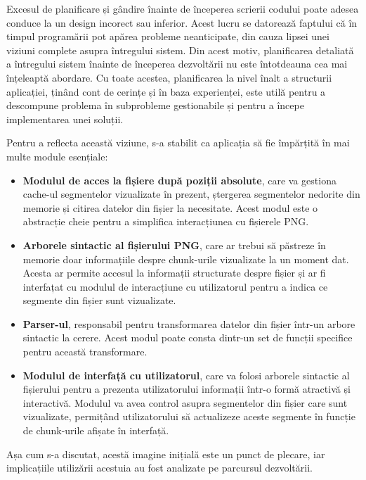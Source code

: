 \documentclass[a4paper,12pt]{report}
\begin{document}
Excesul de planificare și gândire înainte de începerea scrierii codului
poate adesea conduce la un design incorect sau inferior.
Acest lucru se datorează faptului că în timpul programării pot apărea probleme neanticipate,
din cauza lipsei unei viziuni complete asupra întregului sistem.
Din acest motiv, planificarea detaliată a întregului sistem înainte de începerea dezvoltării
nu este întotdeauna cea mai înțeleaptă abordare.
Cu toate acestea, planificarea la nivel înalt a structurii aplicației,
ținând cont de cerințe și în baza experienței,
este utilă pentru a descompune problema în subprobleme gestionabile
și pentru a începe implementarea unei soluții.

Pentru a reflecta această viziune, s-a stabilit ca aplicația
să fie împărțită în mai multe module esențiale:
\begin{itemize}
  \item 
  \textbf{Modulul de acces la fișiere după poziții absolute},
  care va gestiona cache-ul segmentelor vizualizate în prezent,
  ștergerea segmentelor nedorite din memorie și citirea datelor din fișier la necesitate.
  Acest modul este o abstracție cheie pentru a simplifica interacțiunea cu fișierele \ac{PNG}.

  \item
  \textbf{Arborele sintactic al fișierului \ac{PNG}},
  care ar trebui să păstreze în memorie doar informațiile despre
  chunk-urile vizualizate la un moment dat.
  Acesta ar permite accesul la informații structurate despre fișier
  și ar fi interfațat cu modulul de interacțiune cu utilizatorul
  pentru a indica ce segmente din fișier sunt vizualizate.

  \item
  \textbf{Parser-ul}, responsabil pentru transformarea datelor
  din fișier într-un arbore sintactic la cerere.
  Acest modul poate consta dintr-un set de funcții specifice pentru această transformare.

  \item
  \textbf{Modulul de interfață cu utilizatorul},
  care va folosi arborele sintactic al fișierului pentru
  a prezenta utilizatorului informații într-o formă atractivă și interactivă.
  Modulul va avea control asupra segmentelor din fișier care sunt vizualizate,
  permițând utilizatorului să actualizeze aceste segmente
  în funcție de chunk-urile afișate în interfață.
\end{itemize}

Așa cum s-a discutat, acestă imagine inițială este un punct de plecare,
iar implicațiile utilizării acestuia au fost analizate pe parcursul dezvoltării.
\end{document}
